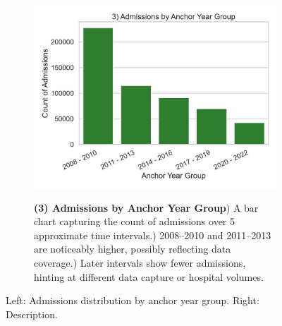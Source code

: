 \documentclass[12pt,a4paper]{report}
\begin{document}
\begin{figure}[ht!]
    \centering
    \begin{subfigure}{0.42\textwidth}
        \includegraphics[width=\linewidth]{mimic_plots/plot3.jpg}
    \end{subfigure}\hfill
    \begin{subfigure}{0.54\textwidth}
        \footnotesize
        \textbf{(3) Admissions by Anchor Year Group}) A bar chart capturing the count of admissions over 5 approximate time intervals.) 2008--2010 and 2011--2013 are noticeably higher, possibly reflecting data coverage.) Later intervals show fewer admissions, hinting at different data capture or hospital volumes.
    \end{subfigure}
    \caption{Left: Admissions distribution by anchor year group. Right: Description.}
    \label{fig:plot3}
\end{figure}
\end{document}
